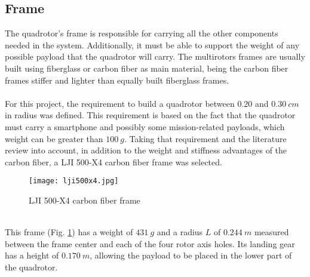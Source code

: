 \subsection{Frame}
The quadrotor's frame is responsible for carrying all the other components needed in the system. Additionally, it must be able to support the weight of any possible payload that the quadrotor will carry. The multirotors frames are usually built using fiberglass or carbon fiber as main material, being the carbon fiber frames stiffer and lighter than equally built fiberglass frames.
\\\\
For this project, the requirement to build a quadrotor between $0.20$ and $0.30\ cm$ in radius was defined. This requirement is based on the fact that the quadrotor must carry a smartphone and possibly some mission-related payloads, which weight can be greater than $100\ g$. Taking that requirement and the literature review into account, in addition to the weight and stiffness advantages of the carbon fiber, a LJI 500-X4 carbon fiber frame was selected.
\begin{figure}[h]
\begin{center}
\texttt{[image: lji500x4.jpg]}    
\caption[LJI 500-X4 carbon fiber frame]{LJI 500-X4 carbon fiber frame\protect\footnotemark} 
\label{fig:quadframe}
\end{center}
\end{figure}
\\
This frame (Fig. \ref{fig:quadframe}) has a weight of $431\ g$ and a radius $L$ of $0.244\ m$ measured between the frame center and each of the four rotor axis holes. Its landing gear has a height of $0.170\ m$, allowing the payload to be placed in the lower part of the quadrotor.

